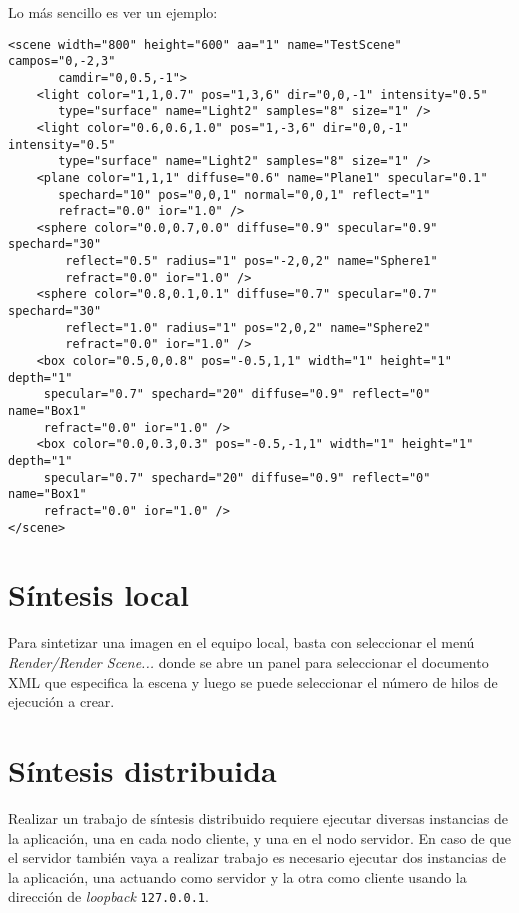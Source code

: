 \documentclass[]{article}
\begin{document}
Lo más sencillo es ver un ejemplo:

\begin{lstlisting}
<scene width="800" height="600" aa="1" name="TestScene" campos="0,-2,3"
       camdir="0,0.5,-1">
    <light color="1,1,0.7" pos="1,3,6" dir="0,0,-1" intensity="0.5"
	   type="surface" name="Light2" samples="8" size="1" />
    <light color="0.6,0.6,1.0" pos="1,-3,6" dir="0,0,-1" intensity="0.5"
	   type="surface" name="Light2" samples="8" size="1" />
    <plane color="1,1,1" diffuse="0.6" name="Plane1" specular="0.1"
	   spechard="10" pos="0,0,1" normal="0,0,1" reflect="1" 
	   refract="0.0" ior="1.0" />  
    <sphere color="0.0,0.7,0.0" diffuse="0.9" specular="0.9" spechard="30"
	    reflect="0.5" radius="1" pos="-2,0,2" name="Sphere1" 
	    refract="0.0" ior="1.0" />  
    <sphere color="0.8,0.1,0.1" diffuse="0.7" specular="0.7" spechard="30" 
	    reflect="1.0" radius="1" pos="2,0,2" name="Sphere2" 
	    refract="0.0" ior="1.0" />  
    <box color="0.5,0,0.8" pos="-0.5,1,1" width="1" height="1" depth="1" 
	 specular="0.7" spechard="20" diffuse="0.9" reflect="0" name="Box1" 
	 refract="0.0" ior="1.0" />  
    <box color="0.0,0.3,0.3" pos="-0.5,-1,1" width="1" height="1" depth="1" 
	 specular="0.7" spechard="20" diffuse="0.9" reflect="0" name="Box1" 
	 refract="0.0" ior="1.0" />  
</scene>
\end{lstlisting}

\section{Síntesis local}

Para sintetizar una imagen en el equipo local, basta con seleccionar el menú \emph{Render/Render Scene...} donde se abre un panel 
para seleccionar el documento XML que especifica la escena y luego se puede seleccionar el número de hilos de ejecución a crear.

\section{Síntesis distribuida}

Realizar un trabajo de síntesis distribuido requiere ejecutar diversas instancias de la aplicación, una en cada nodo cliente, y una en el nodo servidor.  En caso de que el servidor también vaya a realizar trabajo es necesario ejecutar dos instancias de la aplicación, una actuando como servidor y la otra como cliente usando la dirección de \emph{loopback} \texttt{127.0.0.1}.
\end{document}
